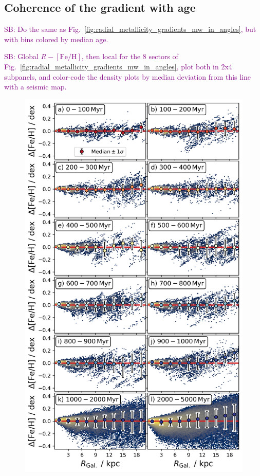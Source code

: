 \documentclass[fleqn,usenatbib]{mnras}
\newcommand{\SB}[1]{{\textcolor{purple}{SB: #1}}}
\begin{document}
\subsection{Coherence of the gradient with age}
\label{sec:coherence_age_radial_metallicity_gradients}

\SB{Do the same as Fig.~\ref{fig:radial_metallicity_gradients_mw_in_angles}, but with bins colored by median age.}

\SB{Global $R-\mathrm{[Fe/H]}$, then local for the 8 sectors of Fig.~\ref{fig:radial_metallicity_gradients_mw_in_angles}, plot both in 2x4 subpanels, and color-code the density plots by median deviation from this line with a seismic map.}

\begin{figure}
    \centering
    \includegraphics[width=\columnwidth]{figures/scatter_with_increasing_age.png}

\end{figure}
\end{document}
